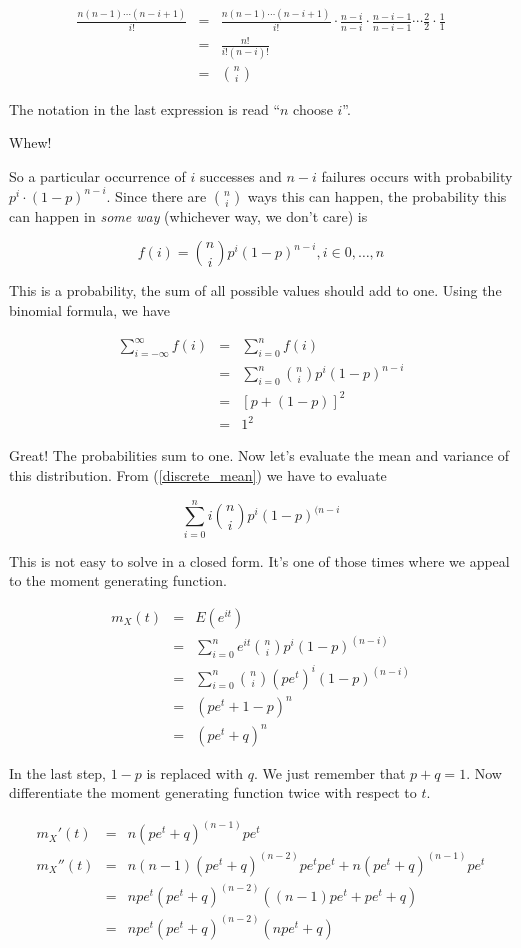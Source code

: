 \documentclass[]{article}
\begin{document}
\begin{eqnarray*}
\frac{n(n-1) \cdots (n-i+1)}{i!} & = & \frac{n(n-1) \cdots (n-i+1)}{i!} \cdot
         \frac{n-i}{n-i} \cdot \frac{n-i-1}{n-i-1} \cdots 
         \frac{2}{2} \cdot \frac{1}{1} \\
      & = & \frac{n!}{i! (n-i)!} \\
      & = & {n \choose i}
\end{eqnarray*}

The notation in the last expression is read ``$n$ choose $i$''.

Whew!

So a particular occurrence of $i$ successes and $n-i$
failures occurs with probability $p^i \cdot (1-p)^{n-i}$.
Since there are ${n \choose i}$ ways this can happen, the
probability this can happen in \emph{some way} 
(whichever way, we don't care) is

\begin{equation} \label{binomial_density}
f(i) = {n \choose i} p^i (1-p)^{n-i}, i \in 0, \ldots, n
\end{equation}

This is a probability, the sum of all possible values
should add to one.  Using the binomial formula, we have

\begin{eqnarray*}
\sum_{i=-\infty}^{\infty} f(i) & = & \sum_{i=0}^{n} f(i) \\
   & = & \sum_{i=0}^{n} {n \choose i} p^i (1-p)^{n-i}  \\
   & = & [ p + (1-p) ]^2 \\
   & = & 1^2
\end{eqnarray*}

Great! The probabilities sum to one.  Now let's evaluate
the mean and variance of this distribution.  From
(\ref{discrete_mean}) we have to evaluate

$$
\sum_{i=0}^n i {n \choose i} p^i (1-p)^{(n-i}
$$

This is not easy to solve in a closed form.  It's
one of those times where we appeal to the moment generating
function.

\begin{eqnarray*}
m_X(t) & = & E(e^{it}) \\
   & = & \sum_{i=0}^n e^{it} {n \choose i} p^i (1-p)^{(n-i)} \\
   & = & \sum_{i=0}^n {n \choose i} (pe^t)^i (1-p)^{(n-i)} \\
   & = & (pe^t + 1 - p)^n \\
   & = & (pe^t + q)^n
\end{eqnarray*}

In the last step, $1-p$ is replaced with $q$.  We just
remember that $p + q = 1$.  Now
differentiate the moment generating function twice with
respect to $t$.

\begin{eqnarray*}
m_X'(t) & = & n(pe^t + q)^{(n-1)} pe^t \\
m_X''(t) & = & n(n-1)(pe^t + q)^{(n-2)} pe^t pe^t +
          n(pe^t + q)^{(n-1)} pe^t \\
   & = & npe^t(pe^t + q)^{(n-2)}((n-1)pe^t + pe^t + q) \\
   & = & npe^t(pe^t + q)^{(n-2)}(npe^t + q)
\end{eqnarray*}
\end{document}
